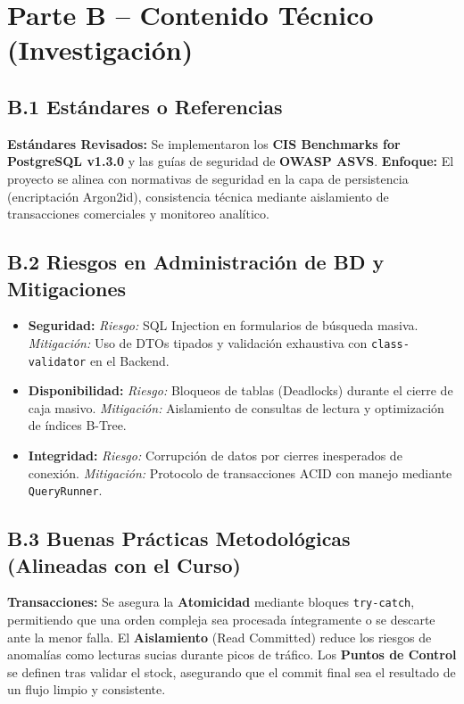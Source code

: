 \documentclass[11pt,a4paper]{article}
\begin{document}
\newpage
\section{Parte B – Contenido Técnico (Investigación)}

\subsection{B.1 Estándares o Referencias}
\textbf{Estándares Revisados:} Se implementaron los \textbf{CIS Benchmarks for PostgreSQL v1.3.0} y las guías de seguridad de \textbf{OWASP ASVS}.
\textbf{Enfoque:} El proyecto se alinea con normativas de seguridad en la capa de persistencia (encriptación Argon2id), consistencia técnica mediante aislamiento de transacciones comerciales y monitoreo analítico.

\subsection{B.2 Riesgos en Administración de BD y Mitigaciones}
\begin{itemize}
    \item \textbf{Seguridad:} \textit{Riesgo:} SQL Injection en formularios de búsqueda masiva. \textit{Mitigación:} Uso de DTOs tipados y validación exhaustiva con \texttt{class-validator} en el Backend.
    \item \textbf{Disponibilidad:} \textit{Riesgo:} Bloqueos de tablas (Deadlocks) durante el cierre de caja masivo. \textit{Mitigación:} Aislamiento de consultas de lectura y optimización de índices B-Tree.
    \item \textbf{Integridad:} \textit{Riesgo:} Corrupción de datos por cierres inesperados de conexión. \textit{Mitigación:} Protocolo de transacciones ACID con manejo mediante \texttt{QueryRunner}.
\end{itemize}

\subsection{B.3 Buenas Prácticas Metodológicas (Alineadas con el Curso)}
\textbf{Transacciones:} 
Se asegura la \textbf{Atomicidad} mediante bloques \texttt{try-catch}, permitiendo que una orden compleja sea procesada íntegramente o se descarte ante la menor falla. El \textbf{Aislamiento} (Read Committed) reduce los riesgos de anomalías como lecturas sucias durante picos de tráfico. Los \textbf{Puntos de Control} se definen tras validar el stock, asegurando que el commit final sea el resultado de un flujo limpio y consistente.
\end{document}
